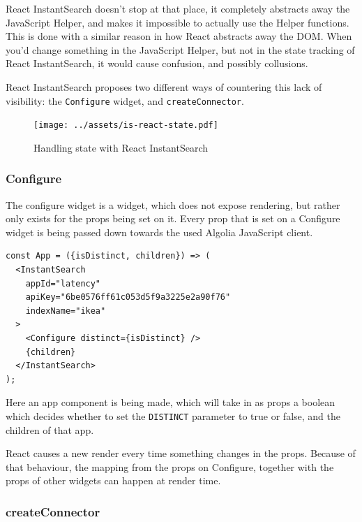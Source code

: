 React InstantSearch doesn't stop at that place, it completely abstracts away the JavaScript Helper, and makes it impossible to actually use the Helper functions. This is done with a similar reason in how React abstracts away the DOM. When you'd change something in the JavaScript Helper, but not in the state tracking of React InstantSearch, it would cause confusion, and possibly collusions.

React InstantSearch proposes two different ways of countering this lack of visibility: the {\tt Configure} widget, and {\tt createConnector}.

\begin{figure}[H]
  \centering
  \texttt{[image: ../assets/is-react-state.pdf]}
  \caption{Handling state with React InstantSearch}
  \label{figure:is-react-state}
\end{figure}

\subsubsection{Configure}
\label{ssub:ris-configure}

The configure widget is a widget, which does not expose rendering, but rather only exists for the props being set on it. Every prop that is set on a Configure widget is being passed down towards the used Algolia JavaScript client.

\begin{lstlisting}[caption={Configure in an InstantSearch container},label={lst:ris-configure}]
const App = ({isDistinct, children}) => (
  <InstantSearch
    appId="latency"
    apiKey="6be0576ff61c053d5f9a3225e2a90f76"
    indexName="ikea"
  >
    <Configure distinct={isDistinct} />
    {children}
  </InstantSearch>
);
\end{lstlisting}

Here an app component is being made, which will take in as props a boolean which decides whether to set the {\tt DISTINCT} parameter to true or false, and the children of that app.

React causes a new render every time something changes in the props. Because of that behaviour, the mapping from the props on Configure, together with the props of other widgets can happen at render time.

\subsubsection{createConnector}
\label{ssub:ris-createconnector}

